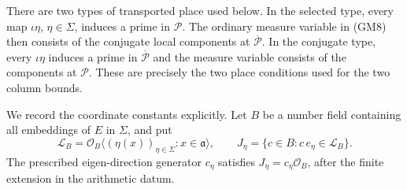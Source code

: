There are two types of transported place used below.
In the selected type, every map $\iota\eta$, $\eta\in\Sigma$,
induces a prime in $\mathcal P$.  The ordinary measure
variable in (GM8) then consists of the conjugate local
components at $\overline{\mathcal P}$.
In the conjugate type, every $\iota\eta$ induces a prime
in $\overline{\mathcal P}$ and the measure variable consists
of the components at $\mathcal P$.  These are precisely the
two place conditions used for the two column bounds.

We record the coordinate constants explicitly.  Let $B$ be a
number field containing all embeddings of $E$ in $\Sigma$,
and put
\[
 \mathcal L_B=\mathcal O_B\langle(\eta(x))_{\eta\in\Sigma}:
                                      x\in\mathfrak a\rangle,
 \qquad J_\eta=\{c\in B:c\,e_\eta\in\mathcal L_B\}.
                                                               \tag{CS5}
\]
The prescribed eigen-direction generator $c_\eta$ satisfies
$J_\eta=c_\eta\mathcal O_B$, after the finite extension in
the arithmetic datum.

